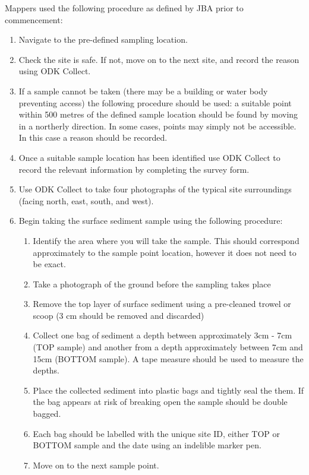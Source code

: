 \documentclass[a4paper,12pt]{article}
\begin{document}
Mappers used the following procedure as defined by JBA prior to commencement:
\begin{enumerate}
\item Navigate to the pre-defined sampling location.
\item Check the site is safe. If not, move on to the next site, and record the reason using ODK Collect.
\item If a sample cannot be taken (there may be a building or water body preventing access) the following procedure should be used: a suitable point within 500 metres of the defined sample location should be found by moving in a northerly direction. In some cases, points may simply not be accessible. In this case a reason should be recorded.
\item Once a suitable sample location has been identified use ODK Collect to record the relevant information by completing the survey form.
\item Use ODK Collect to take four photographs of the typical site surroundings (facing north, east, south, and west).
\item Begin taking the surface sediment sample using the following procedure:
\begin{enumerate}
\item Identify the area where you will take the sample. This should correspond
approximately to the sample point location, however it does not need to be exact.
\item Take a photograph of the ground before the sampling takes place
\item Remove the top layer of surface sediment using a pre-cleaned trowel or scoop (3 cm should be removed and discarded)
\item Collect one bag of sediment a depth between approximately 3cm - 7cm (TOP sample) and another from a depth approximately between 7cm and 15cm (BOTTOM sample). A tape measure should be used to measure the depths.
\item Place the collected sediment into plastic bags and tightly seal the them. If the bag appears at risk of breaking open the sample should be double bagged.
\item Each bag should be labelled with the unique site ID, either TOP or BOTTOM sample and the date using an indelible marker pen.
\item Move on to the next sample point.
\end{enumerate}
\end{enumerate}
\end{document}
